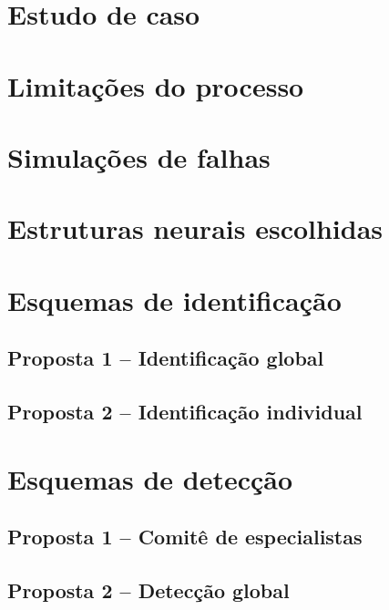 \label{cap:sistema}

\section{Estudo de caso}

\section{Limitações do processo}

\section{Simulações de falhas}

\section{Estruturas neurais escolhidas}

\section{Esquemas de identificação}

\subsection{Proposta 1 -- Identificação global}

\subsection{Proposta 2 -- Identificação individual}

\section{Esquemas de detecção}

\subsection{Proposta 1 -- Comitê de especialistas}

\subsection{Proposta 2 -- Detecção global}
